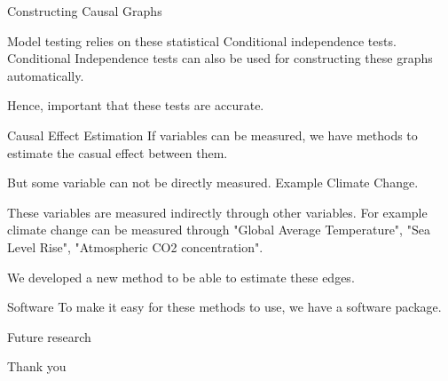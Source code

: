 \documentclass[aspectratio=169]{beamer}
\begin{document}
\begin{frame}{Constructing Causal Graphs}

	Model testing relies on these statistical Conditional independence tests.
	Conditional Independence tests can also be used for constructing these graphs
	automatically.

	Hence, important that these tests are accurate.
\end{frame}

\begin{frame}{Causal Effect Estimation}
	If variables can be measured, we have methods to estimate the casual effect between them.

	But some variable can not be directly measured. Example Climate Change.

	These variables are measured indirectly through other variables. For example climate change can be measured through "Global Average Temperature", "Sea Level Rise", "Atmospheric CO2 concentration".

	We developed a new method to be able to estimate these edges.
\end{frame}

\begin{frame}{Software}
	To make it easy for these methods to use, we have a software package.
\end{frame}

\begin{frame}{Future research}	
\end{frame}

\begin{frame}
	\Huge{Thank you}
\end{frame}
\end{document}
